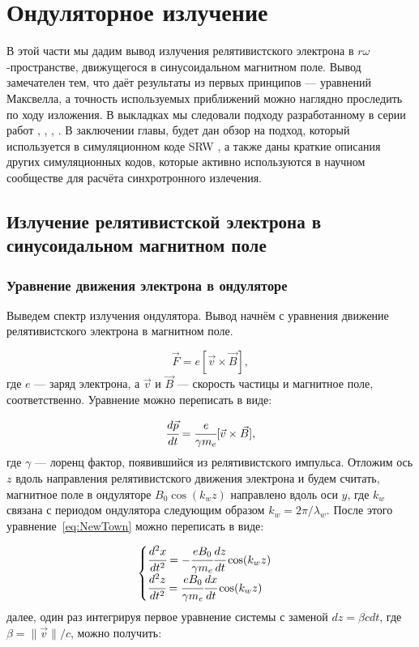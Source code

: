 \chapter{Ондуляторное излучение}
В этой части мы дадим вывод излучения релятивистского электрона в $r\omega$-пространстве, движущегося в синусоидальном магнитном поле. Вывод замечателен тем, что даёт результаты из первых принципов --- уравнений Максвелла, а точность используемых приближений можно наглядно проследить по ходу изложения. В выкладках мы следовали подходу разработанному в серии работ \cite{geloni2005paraxial}, \cite{geloni2007fourier}, \cite{geloni2015brightness }, \cite{geloni2006fourier}. В заключении главы, будет дан обзор на подход, который используется в симуляционном коде SRW \cite{chubar1998proceedings}, а также даны краткие описания других симуляционных кодов, которые активно используются в научном сообществе для расчёта синхротронного излечения. 
\section{Излучение релятивистской электрона в синусоидальном магнитном поле}
\subsection{Уравнение движения электрона в ондуляторе}
Выведем спектр излучения ондулятора. Вывод начнём с уравнения движение релятивистского электрона в магнитном поле.

\begin{equation}
	\vec{F} = e[\vec{v} \times \vec{B}],
\end{equation} 
где $e$ --- заряд электрона, а $\vec{v}$ и $\vec{B}$ --- скорость частицы и магнитное поле, соответственно. Уравнение можно переписать в виде:

\begin{equation}
	\label{eq:NewTown}
	\cfrac{d\vec{p}}{dt} = \cfrac{e}{\gamma m_e}[\vec{v} \times \vec{B}],
\end{equation}
где $\gamma$ --- лоренц фактор, появившийся из релятивистского импульса. Отложим ось $z$ вдоль направления релятивистского движения электрона и будем считать, магнитное поле в ондуляторе $B_0\cos(k_w z)$ направлено вдоль оси $y$, где $k_w$ связана с периодом ондулятора следующим образом $k_w = 2\pi/\lambda_w$. После этого уравнение~\ref{eq:NewTown} можно переписать в виде:

\begin{equation}
	\label{eq:eq_of_motion}
	\begin{cases}
		\cfrac{d^2 x}{dt^2} = - \cfrac{e B_0}{\gamma m_e}\cfrac{dz}{dt} \cos(k_w z)\\
		\cfrac{d^2 z}{dt^2} = \cfrac{e B_0}{\gamma m_e}\cfrac{dx}{dt} \cos(k_w z)
	\end{cases} 
\end{equation}
далее, один раз интегрируя первое уравнение системы с заменой $dz = \beta cdt$, где $\beta = \|\vec{v}\| /c$, можно получить: 

